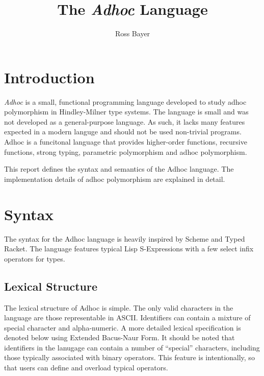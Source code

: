 \documentclass[11pt,a4paper]{article}
\title{The \textit{Adhoc} Language}
\author{Ross Bayer}
\date{}
\begin{document}
\maketitle



\section{Introduction}

\textit{Adhoc} is a small, functional programming language developed to study
adhoc polymorphism in Hindley-Milner type systems. The language is small and
was not developed as a general-purpose language. As such, it lacks many features
expected in a modern languge and should not be used non-trivial programs. Adhoc
is a funcitonal language that provides higher-order functions, recursive
functions, strong typing, parametric polymorphism and adhoc polymorphism.

This report defines the syntax and semantics of the Adhoc language. The
implementation details of adhoc polymorphism are explained in detail.



\section{Syntax}

The syntax for the Adhoc language is heavily inspired by Scheme and Typed
Racket. The language features typical Lisp S-Expressions with a few select infix
operators for types.


\subsection{Lexical Structure}

The lexical structure of Adhoc is simple. The only valid characters in the
language are those representable in ASCII. Identifiers can contain a mixture of
special character and alpha-numeric. A more detailed lexical specification is
denoted below using Extended Bacus-Naur Form. It should be noted that
identifiers in the lanugage can contain a number of ``special'' characters,
including those typically associated with binary operators. This feature is
intentionally, so that users can define and overload typical operators.
\end{document}
